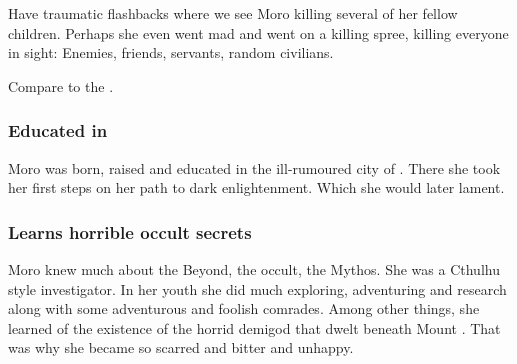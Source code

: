 Have traumatic flashbacks where we see Moro killing several of her fellow children. 
Perhaps she even went mad and went on a killing spree, killing everyone in sight: 
Enemies, friends, servants, random civilians. 

Compare to the \cite{Anime:ElfenLied}.






\subsubsection{Educated in \Yormis}
Moro was born, raised and educated in the ill-rumoured city of . 
There she took her first steps on her path to dark enlightenment.
Which she would later lament.





\subsubsection{Learns horrible occult secrets}
Moro \Cornel knew much about the Beyond, the occult, the \Miith Mythos. 
She was a Cthulhu style investigator. 
In her youth she did much exploring, adventuring and research along with some adventurous and foolish comrades. 
Among other things, she learned of the existence of the horrid demigod  that dwelt beneath Mount \Shrun. 
That was why she became so scarred and bitter and unhappy. 

